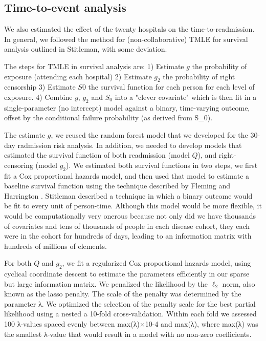 \documentclass[]{article}\usepackage[]{graphicx}\usepackage[]{color}
\begin{document}
\subsection{Time-to-event analysis}
We also estimated the effect of the twenty hospitals on the time-to-readmission. In general, we followed the method for (non-collaborative) TMLE for survival analysis outlined in Stitleman, with some deviation. 

The steps for TMLE in survival analysis are: 1) Estimate $g$ the probability of exposure (attending each hospital) 2) Estimate $g_2$ the probability of right censorship 3) Estimate $S0$ the survival function for each person for each level of exposure. 4) Combine $g$, $g_2$ and $S_0$ into a "clever covariate" which is then fit in a single-parameter (no intercept) model against a binary, time-varying outcome, offset by the conditional failure probability (as derived from S_0).

The estimate $g$, we reused the random forest model that we developed for the 30-day radmission risk analysis. In addition, we needed to develop models that estimated the survival function of both readmission (model $Q$), and right-censoring (model $g_2$). We estimated both survival functions in two steps, we first fit a Cox proportional hazards model, and then used that model to estimate a baseline survival function using the technique described by Fleming and Harrington \supercite{}. Stitleman described a technique in which a binary outcome would be fit to every unit of person-time. Although this model would be more flexible, it would be computationally very onerous because not only did we have thousands of covariates and tens of thousands of people in each disease cohort, they each were in the cohort for hundreds of days, leading to an information matrix with hundreds of millions of elements.

For both \(Q\) and \(g_2\), we fit a regularized Cox proportional hazards model, using cyclical coordinate descent to estimate the parameters efficiently in our sparse but large information matrix. We penalized the likelihood by the \(\ell_2\) norm, also known as the lasso penalty. The scale of the penalty was determined by the parameter λ. We optimized the selection of the penalty scale for the best partial likelihood using a nested a 10-fold cross-validation. Within each fold we assessed 100 λ-values spaced evenly between max(λ)×10-4 and max(λ), where max(λ) was the smallest λ-value that would result in a model with no non-zero coefficients.
\end{document}
